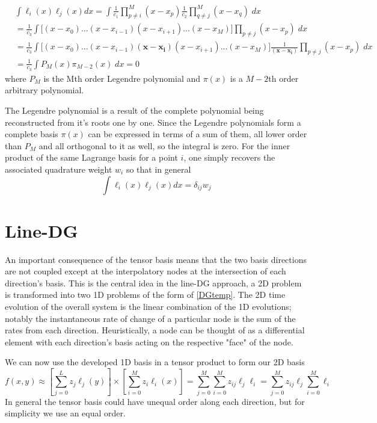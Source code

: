 \documentclass[letterpaper,12pt]{report}
\newcommand{\be}{\begin{equation}}
\newcommand{\ee}{\end{equation}}
\begin{document}
\be \begin{split} &\int \ell_i(x) \ell_j(x) dx = \int \frac{1}{c_1} \prod_{p\neq i}^M (x-x_p) \frac{1}{c_2}\prod_{q \neq j}^M (x-x_q) \;dx \\ 
&=\frac{1}{c_3} \int  \Big[(x-x_0)...(x-x_{i-1})(x-x_{i+1})...(x-x_M)\Big]\prod_{p \neq j} (x-x_p) \;dx\\
&=\frac{1}{c_3} \int  \Big[(x-x_0)...(x-x_{i-1}) \boldsymbol{(x-x_i)}(x-x_{i+1})...(x-x_M)\Big] \frac{1}{\boldsymbol{(x-x_i)}}\prod_{p \neq j} (x-x_p) \;dx\\
&=\frac{1}{c_3} \int  P_M(x) \pi_{M-2}(x) \;dx= 0\end{split}\ee
where $P_M$ is the Mth order Legendre polynomial and $\pi(x)$ is a $M-2$th order arbitrary polynomial.

The Legendre polynomial is a result of the complete  polynomial being reconstructed from it's roots one by one. Since the Legendre polynomials form a complete basis $\pi(x)$ can be expressed in terms of a sum of them, all lower order than $P_M$ and all orthogonal to it as well, so the integral is zero. For the inner product of the same Lagrange basis for a point $i$, one simply recovers the associated quadrature weight $w_i$ so that in general
\be \int \ell_i(x) \ell_j(x) dx = \delta_{ij} w_j \ee

%
\section{Line-DG}
An important consequence of the tensor basis means that the two basis directions are not coupled except at the interpolatory nodes at the intersection of each direction's basis. This is the central idea in the line-DG \cite{Persson2013} approach, a 2D problem is transformed into two 1D problems of the form of \eqref{DGtemp}. The 2D time evolution of the overall system is the linear combination of the 1D evolutions; notably the instantaneous rate of change of a particular node is the sum of the rates from each direction. Heuristically, a node can be thought of as a differential element with each direction's basis acting on the respective "face" of the node.

We can now use the developed 1D basis in a tensor product to form our 2D basis
\be f(x,y) \approx \left[\sum_{j=0}^L z_j \ell_j(y) \right] \times \left[ \sum_{i=0}^M z_i \ell_i(x) \right] = \sum_{j=0}^M \sum_{i=0}^M z_{ij} \ell_j \ell_i =  \sum_{j=0}^M z_{ij} \ell_j \sum_{i=0}^M  \ell_i \ee
In general the tensor basis could have unequal order along each direction, but for simplicity we use an equal order.
\end{document}
